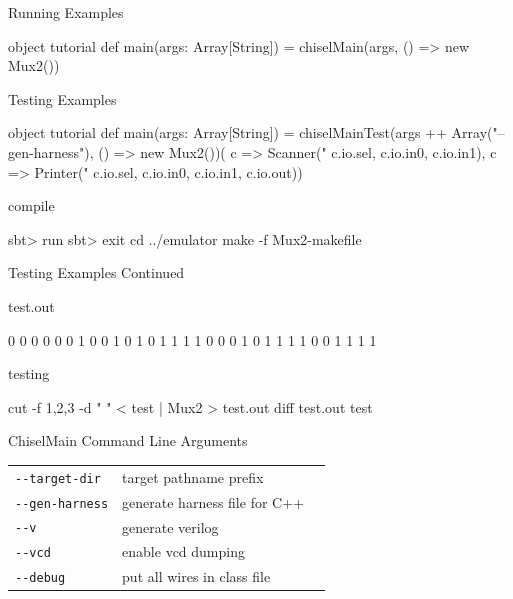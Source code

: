 \documentclass[xcolor=pdflatex,dvipsnames,table]{beamer}
\begin{document}
\begin{frame}[fragile]{Running Examples}
\begin{scala}
object tutorial {
  def main(args: Array[String]) = {
    chiselMain(args, () => new Mux2())
  }
}
\end{scala}
\end{frame}

\begin{frame}{Testing Examples}

\begin{scala}
object tutorial {
  def main(args: Array[String]) = {
    chiselMainTest(args ++ Array("--gen-harness"), 
                   () => new Mux2())(
      c => Scanner("%
                   c.io.sel, c.io.in0, c.io.in1),
      c => Printer("%
                   c.io.sel, c.io.in0, c.io.in1, c.io.out))
  }
}
\end{scala}

compile

\begin{scala}
sbt> run
sbt> exit
cd ../emulator
make -f Mux2-makefile
\end{scala}

\end{frame}

\begin{frame}{Testing Examples Continued}

test.out

\begin{scala}
0 0 0 0
0 0 1 0
0 1 0 1
0 1 1 1
1 0 0 0
1 0 1 1
1 1 0 0
1 1 1 1
\end{scala}

testing

\begin{scala}
cut -f 1,2,3 -d " " < test | Mux2 > test.out
diff test.out test
\end{scala}

\end{frame}

\begin{frame}[fragile]{ChiselMain Command Line Arguments}
\begin{tabular}{lll}
\verb+--target-dir+ & target pathname prefix \\
\verb+--gen-harness+ & generate harness file for C++ \\
\verb+--v+ & generate verilog \\
\verb+--vcd+ & enable vcd dumping \\
\verb+--debug+ & put all wires in class file \\
\end{tabular}
\end{frame}
\end{document}
